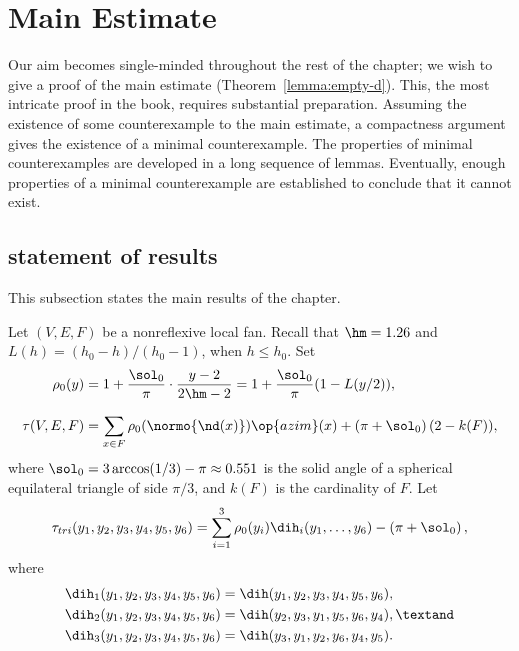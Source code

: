 \section{Main Estimate}\label{sec:weight}  

Our aim becomes single-minded throughout the rest of the chapter; we
wish to give a proof of the main estimate (Theorem~\ref{lemma:empty-d}).
This,  the most intricate proof in the book,  requires substantial
preparation.  Assuming the existence of some counterexample to the main estimate, a
compactness argument gives the existence of a minimal counterexample.
The properties of minimal counter\-examples are developed in a long
sequence of lemmas.  Eventually, enough properties of a minimal
counterexample are established to conclude that it cannot exist.

\subsection{statement of results}\label{sec:statement}

This subsection states the main results of the chapter.


\begin{definition}\label{def:tau}
Let $(V,E,F)$ be a nonreflexive local fan.  Recall that $\hm = 1.26$ and
$L(h) = ({h_0-h})/({h_0-1})$, when $h \le h_0$.
  Set
\begin{align*}
\rho_0(y) &= 1 + \dfrac{\sol_0}{\pi} \cdot
    \dfrac{y-2}{2\hm-2} = 1 + \dfrac{\sol_0}{\pi}(1 - L(y/2)),\\
  \tau(V,E,F) &=\sum_{x\in F}^{\phantom{!}} \rho_0(\normo{\nd(x)})\op{azim}(x)
+ \left(\pi+{\sol_0}\right) (2- k(F)),
\end{align*}
where $\sol_0=3\arccos(1/3)-\pi\approx0.551$ is the solid angle of a
spherical equilateral triangle of side $\pi/3$, and $k(F)$ is the
cardinality of $F$.  
Let 
\begin{equation}\label{eqn:tautri}
  \tau_{tri}(y_1,y_2,y_3,y_4,y_5,y_6) =
  \sum_{i=1}^3 \rho_0(y_i) \dih_i(y_1,\ldots,y_6)
- \left(\pi+{\sol_0}\right),
\end{equation}
where
\begin{align}\label{eqn:dihi}
\dih_1(y_1,y_2,y_3,y_4,y_5,y_6) &= \dih(y_1,y_2,y_3,y_4,y_5,y_6),\notag\\
\dih_2(y_1,y_2,y_3,y_4,y_5,y_6) &= \dih(y_2,y_3,y_1,y_5,y_6,y_4),\textand\notag \\
\dih_3(y_1,y_2,y_3,y_4,y_5,y_6) &= \dih(y_3,y_1,y_2,y_6,y_4,y_5).
\end{align}
%
%
%
%
%
%
%
\end{definition}


